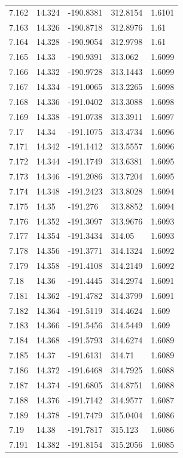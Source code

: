 \begin{tabular}{lllll}
7.162 & 14.324 & -190.8381 & 312.8154 & 1.6101 \\
7.163 & 14.326 & -190.8718 & 312.8976 & 1.61 \\
7.164 & 14.328 & -190.9054 & 312.9798 & 1.61 \\
7.165 & 14.33 & -190.9391 & 313.062 & 1.6099 \\
7.166 & 14.332 & -190.9728 & 313.1443 & 1.6099 \\
7.167 & 14.334 & -191.0065 & 313.2265 & 1.6098 \\
7.168 & 14.336 & -191.0402 & 313.3088 & 1.6098 \\
7.169 & 14.338 & -191.0738 & 313.3911 & 1.6097 \\
7.17 & 14.34 & -191.1075 & 313.4734 & 1.6096 \\
7.171 & 14.342 & -191.1412 & 313.5557 & 1.6096 \\
7.172 & 14.344 & -191.1749 & 313.6381 & 1.6095 \\
7.173 & 14.346 & -191.2086 & 313.7204 & 1.6095 \\
7.174 & 14.348 & -191.2423 & 313.8028 & 1.6094 \\
7.175 & 14.35 & -191.276 & 313.8852 & 1.6094 \\
7.176 & 14.352 & -191.3097 & 313.9676 & 1.6093 \\
7.177 & 14.354 & -191.3434 & 314.05 & 1.6093 \\
7.178 & 14.356 & -191.3771 & 314.1324 & 1.6092 \\
7.179 & 14.358 & -191.4108 & 314.2149 & 1.6092 \\
7.18 & 14.36 & -191.4445 & 314.2974 & 1.6091 \\
7.181 & 14.362 & -191.4782 & 314.3799 & 1.6091 \\
7.182 & 14.364 & -191.5119 & 314.4624 & 1.609 \\
7.183 & 14.366 & -191.5456 & 314.5449 & 1.609 \\
7.184 & 14.368 & -191.5793 & 314.6274 & 1.6089 \\
7.185 & 14.37 & -191.6131 & 314.71 & 1.6089 \\
7.186 & 14.372 & -191.6468 & 314.7925 & 1.6088 \\
7.187 & 14.374 & -191.6805 & 314.8751 & 1.6088 \\
7.188 & 14.376 & -191.7142 & 314.9577 & 1.6087 \\
7.189 & 14.378 & -191.7479 & 315.0404 & 1.6086 \\
7.19 & 14.38 & -191.7817 & 315.123 & 1.6086 \\
7.191 & 14.382 & -191.8154 & 315.2056 & 1.6085 \\

\end{tabular}
